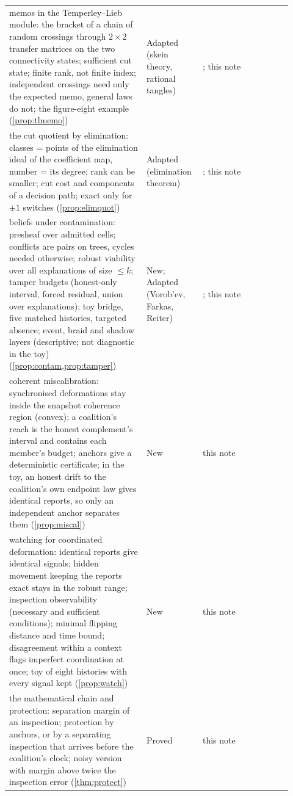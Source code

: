 \documentclass[11pt]{article}
\theoremstyle{definition}\newtheorem{definition}[theorem]{Definition}\newtheorem{remark}[theorem]{Remark}\newtheorem{example}[theorem]{Example}\newtheorem{problem}[theorem]{Open problem}\crefname{problem}{Problem}{Problems}
\begin{document}
{\begin{longtable}{p{0.46\linewidth}p{0.16\linewidth}p{0.3\linewidth}}
\rowcolor{stAdapted} memos in the Temperley--Lieb module: the bracket of a chain of random crossings through $2\times2$ transfer matrices on the two connectivity states; sufficient cut state; finite rank, not finite index; independent crossings need only the expected memo, general laws do not; the figure-eight example (\cref{prop:tlmemo}) & Adapted (skein theory, rational tangles) & \cite{Kauffman1987,Conway1970,DiamantisKauffman2026}; this note\\
\rowcolor{stAdapted} the cut quotient by elimination: classes = points of the elimination ideal of the coefficient map, number = its degree; rank can be smaller; cut cost and components of a decision path; exact only for $\pm1$ switches (\cref{prop:elimquot}) & Adapted (elimination theorem) & \cite{CoxLittleOShea2015}; this note\\
\rowcolor{stNew} beliefs under contamination: presheaf over admitted cells; conflicts are pairs on trees, cycles needed otherwise; robust viability over all explanations of size $\le k$; tamper budgets (honest-only interval, forced residual, union over explanations); toy bridge, five matched histories, targeted absence; event, braid and shadow layers (descriptive; not diagnostic in the toy) (\cref{prop:contam,prop:tamper}) & New; Adapted (Vorob'ev, Farkas, Reiter) & \cite{Vorobev1962,Reiter1987,Schrijver1986}; this note\\
\rowcolor{stNew} coherent miscalibration: synchronised deformations stay inside the snapshot coherence region (convex); a coalition's reach is the honest complement's interval and contains each member's budget; anchors give a deterministic certificate; in the toy, an honest drift to the coalition's own endpoint law gives identical reports, so only an independent anchor separates them (\cref{prop:miscal}) & New & this note\\
\rowcolor{stNew} watching for coordinated deformation: identical reports give identical signals; hidden movement keeping the reports exact stays in the robust range; inspection observability (necessary and sufficient conditions); minimal flipping distance and time bound; disagreement within a context flags imperfect coordination at once; toy of eight histories with every signal kept (\cref{prop:watch}) & New & this note\\
\rowcolor{stNew} the mathematical chain and protection: separation margin of an inspection; protection by anchors, or by a separating inspection that arrives before the coalition's clock; noisy version with margin above twice the inspection error (\cref{thm:protect}) & Proved & this note\\

\end{longtable}}
\end{document}
